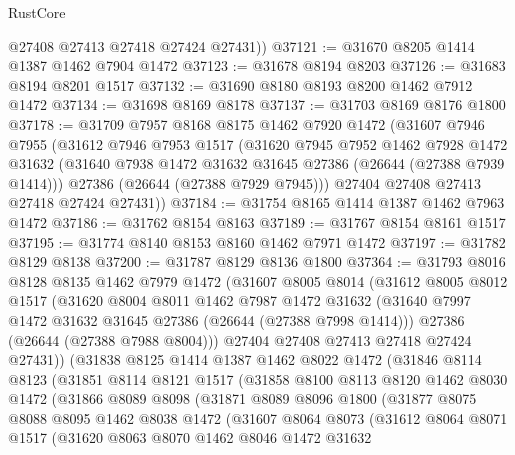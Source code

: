 \begin{lexlean}{RustCore}
\begin{coremodule}
        @27408
        @27413
        @27418
        @27424
        @27431))
@37121 := @31670 @8205 @1414 @1387 @1462 @7904 @1472
@37123 := @31678 @8194 @8203
@37126 := @31683 @8194 @8201 @1517
@37132 := @31690 @8180 @8193 @8200 @1462 @7912 @1472
@37134 := @31698 @8169 @8178
@37137 := @31703 @8169 @8176 @1800
@37178 := @31709
    @7957
    @8168
    @8175
    @1462
    @7920
    @1472
    (@31607
      @7946
      @7955
      (@31612
        @7946
        @7953
        @1517
        (@31620
          @7945
          @7952
          @1462
          @7928
          @1472
          @31632
          (@31640 @7938 @1472 @31632 @31645 @27386 (@26644 (@27388 @7939 @1414)))
          @27386
          (@26644 (@27388 @7929 @7945)))
        @27404
        @27408
        @27413
        @27418
        @27424
        @27431))
@37184 := @31754 @8165 @1414 @1387 @1462 @7963 @1472
@37186 := @31762 @8154 @8163
@37189 := @31767 @8154 @8161 @1517
@37195 := @31774 @8140 @8153 @8160 @1462 @7971 @1472
@37197 := @31782 @8129 @8138
@37200 := @31787 @8129 @8136 @1800
@37364 := @31793
    @8016
    @8128
    @8135
    @1462
    @7979
    @1472
    (@31607
      @8005
      @8014
      (@31612
        @8005
        @8012
        @1517
        (@31620
          @8004
          @8011
          @1462
          @7987
          @1472
          @31632
          (@31640 @7997 @1472 @31632 @31645 @27386 (@26644 (@27388 @7998 @1414)))
          @27386
          (@26644 (@27388 @7988 @8004)))
        @27404
        @27408
        @27413
        @27418
        @27424
        @27431))
    (@31838
      @8125
      @1414
      @1387
      @1462
      @8022
      @1472
      (@31846
        @8114
        @8123
        (@31851
          @8114
          @8121
          @1517
          (@31858
            @8100
            @8113
            @8120
            @1462
            @8030
            @1472
            (@31866
              @8089
              @8098
              (@31871
                @8089
                @8096
                @1800
                (@31877
                  @8075
                  @8088
                  @8095
                  @1462
                  @8038
                  @1472
                  (@31607
                    @8064
                    @8073
                    (@31612
                      @8064
                      @8071
                      @1517
                      (@31620
                        @8063
                        @8070
                        @1462
                        @8046
                        @1472
                        @31632

\end{coremodule}
\end{lexlean}
